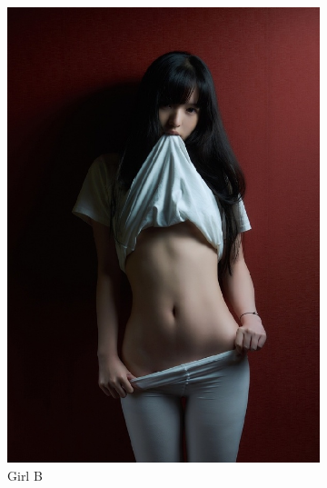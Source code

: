 \begin{figure}[tbp]
\begin{subfigure}[tbp]{0.3\linewidth}
    \includegraphics[width=\linewidth]{sub2}
    \caption{Girl B}
  \end{subfigure}
  ~
  \begin{subfigure}[tbp]{0.3\linewidth}

\end{subfigure}
\end{figure}

